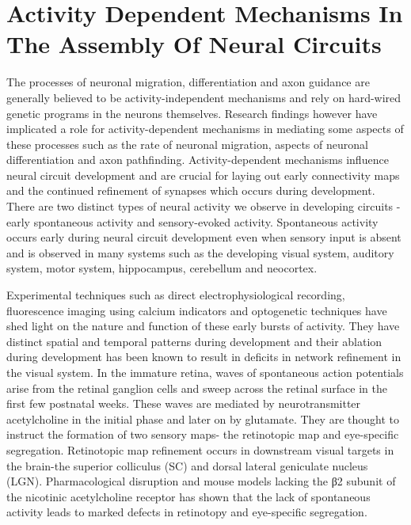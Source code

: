 \hypertarget{activity-dependent-mechanisms-in-the-assembly-of-neural-circuits}{%
\section{Activity Dependent Mechanisms In The Assembly Of Neural Circuits}\label{activity-dependent-mechanisms-in-the-assembly-of-neural-circuits}}

The processes of neuronal migration, differentiation and axon guidance are generally believed to be activity-independent mechanisms and rely on hard-wired genetic programs in the neurons themselves. Research findings however have implicated a role for activity-dependent mechanisms in mediating some aspects of these processes such as the rate of neuronal migration, aspects of neuronal differentiation and axon pathfinding. Activity-dependent mechanisms influence neural circuit development and are crucial for laying out early connectivity maps and the continued refinement of synapses which occurs during development. There are two distinct types of neural activity we observe in developing circuits -early spontaneous activity and sensory-evoked activity. Spontaneous activity occurs early during neural circuit development even when sensory input is absent and is observed in many systems such as the developing visual system, auditory system, motor system, hippocampus, cerebellum and neocortex.

Experimental techniques such as direct electrophysiological recording, fluorescence imaging using calcium indicators and optogenetic techniques have shed light on the nature and function of these early bursts of activity. They have distinct spatial and temporal patterns during development and their ablation during development has been known to result in deficits in network refinement in the visual system. In the immature retina, waves of spontaneous action potentials arise from the retinal ganglion cells and sweep across the retinal surface in the first few postnatal weeks. These waves are mediated by neurotransmitter acetylcholine in the initial phase and later on by glutamate. They are thought to instruct the formation of two sensory maps- the retinotopic map and eye-specific segregation. Retinotopic map refinement occurs in downstream visual targets in the brain-the superior colliculus (SC) and dorsal lateral geniculate nucleus (LGN). Pharmacological disruption and mouse models lacking the β2 subunit of the nicotinic acetylcholine receptor has shown that the lack of spontaneous activity leads to marked defects in retinotopy and eye-specific segregation.

